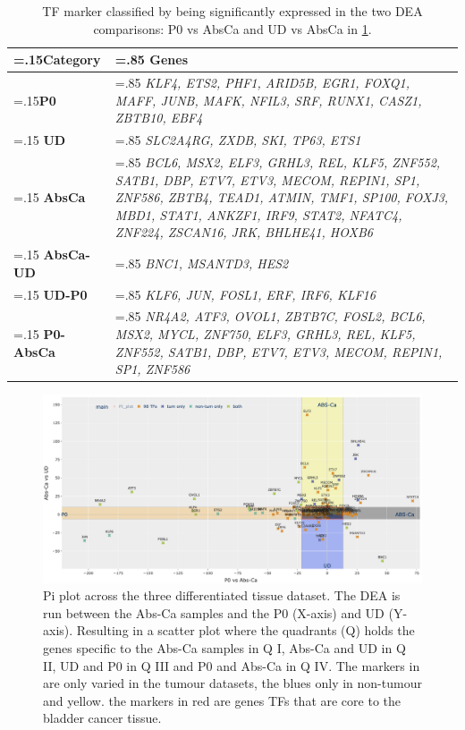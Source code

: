 \begin{table}[!htb]
  \centering
  \small
  \begin{tabularx}{\textwidth}{>{\hsize=.15\hsize}X|>{\hsize=.85\hsize}X}
    \toprule
    \textbf{Category} & \textbf{Genes} \\
    \midrule
    \textbf{P0} & \textit{KLF4, ETS2, PHF1, ARID5B, EGR1, FOXQ1, MAFF, JUNB, MAFK, NFIL3, SRF, RUNX1, CASZ1, ZBTB10, EBF4} \\
    \midrule
    \textbf{UD} & \textit{SLC2A4RG, ZXDB, SKI, TP63, ETS1} \\
    \midrule
    \textbf{AbsCa} & \textit{BCL6, MSX2, ELF3, GRHL3, REL, KLF5, ZNF552, SATB1, DBP, ETV7, ETV3, MECOM, REPIN1, SP1, ZNF586, ZBTB4, TEAD1, ATMIN, TMF1, SP100, FOXJ3, MBD1, STAT1, ANKZF1, IRF9, STAT2, NFATC4, ZNF224, ZSCAN16, JRK, BHLHE41, HOXB6} \\
    \midrule
    \textbf{AbsCa-UD} & \textit{BNC1, MSANTD3, HES2} \\
    \midrule
    \textbf{UD-P0} & \textit{KLF6, JUN, FOSL1, ERF, IRF6, KLF16} \\
    \midrule
    \textbf{P0-AbsCa} & \textit{NR4A2, ATF3, OVOL1, ZBTB7C, FOSL2, BCL6, MSX2, MYCL, ZNF750, ELF3, GRHL3, REL, KLF5, ZNF552, SATB1, DBP, ETV7, ETV3, MECOM, REPIN1, SP1, ZNF586} \\
    \bottomrule
  \end{tabularx}
  \caption{TF marker classified by being significantly expressed in the two DEA comparisons: P0 vs AbsCa and UD vs AbsCa in \cref{fig:N_I:pi_sel_tfs_var}.} 
  \label{tab:N_I:markers_diff}
\end{table}

\begin{figure}
    \includegraphics[width=1.0\textwidth,height=1.0\textheight,keepaspectratio]{Sections/Network_I/Resources/selective_pruning/sel_tfs/sel_tfs_pi_all_var_rect.png}
    \caption{Pi plot across the three differentiated tissue dataset. The DEA is run between the Abs-Ca samples and the P0 (X-axis) and UD (Y-axis). Resulting in a scatter plot where the quadrants (Q) holds the genes specific to the Abs-Ca samples in Q I, Abs-Ca and UD in Q II, UD and P0 in Q III and P0 and Abs-Ca in Q IV. The markers in 
    are only varied in the tumour datasets, the blues only in non-tumour and yellow. the markers in red are genes TFs that are core to the bladder cancer tissue. }
    \label{fig:N_I:pi_sel_tfs_var}
\end{figure}

